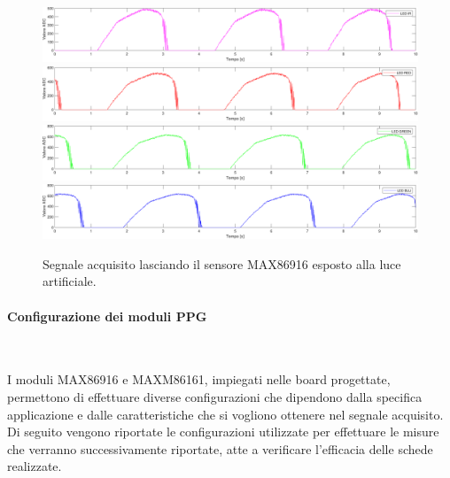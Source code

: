 \begin{figure}[h]
	\centering
	\includegraphics[width=1\linewidth]{ImageFiles/Misure Preliminari/ambiente_ired}
	\includegraphics[width=1\linewidth]{ImageFiles/Misure Preliminari/ambiente_red}
	\includegraphics[width=1\linewidth]{ImageFiles/Misure Preliminari/ambiente_green}
	\includegraphics[width=1\linewidth]{ImageFiles/Misure Preliminari/ambiente_blu}
	\caption{Segnale acquisito lasciando il sensore MAX86916 esposto alla luce artificiale.}
	\label{fig:ambiente_MAX86916}
\end{figure}

\paragraph{Configurazione dei moduli PPG}~


\noindent I moduli MAX86916 e MAXM86161, impiegati nelle board progettate, permettono di effettuare diverse configurazioni che dipendono dalla specifica applicazione e dalle caratteristiche che si vogliono ottenere nel segnale acquisito. Di seguito vengono riportate le configurazioni utilizzate per effettuare le misure che verranno successivamente riportate, atte a verificare l'efficacia delle schede realizzate.

